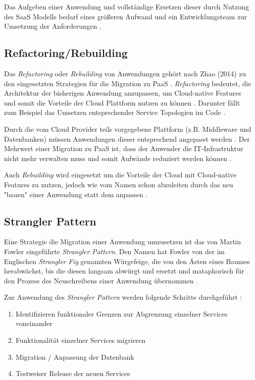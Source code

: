 Das Aufgeben einer Anwendung und vollständige Ersetzen dieser durch Nutzung des \ac{SaaS} Modells bedarf eines größeren Aufwand und ein Entwicklungsteam zur Umsetzung der Anforderungen \cite[Vgl.][]{CIO}. \pagebreak

\subsection{Refactoring/Rebuilding}
Das \textit{Refactoring} oder \textit{Rebuilding} von Anwendungen gehört nach Zhao (2014) zu den eingesetzten Strategien für die Migration zu \ac{PaaS} \cite[Vgl.][S. 144]{Zhao2014}. \textit{Refactoring} bedeutet, die Architektur der bisherigen Anwendung anzupassen, um Cloud-native Features \cite[Vgl.][S. 2]{Ahmad2018} und somit die Vorteile der Cloud Plattform nutzen zu können \cite[Vgl.][]{CIO}. Darunter fällt zum Beispiel das Umsetzen entsprechender Service Topologien im Code \cite[Vgl.][S. 2]{Holmes2018}.

Durch die vom Cloud Provider teils vorgegebene Plattform (z.B. Middleware und Datenbanken) müssen Anwendungen dieser entsprechend angepasst werden \cite[Vgl.][S. 227]{Surianarayanan2019}. Der Mehrwert einer Migration zu \ac{PaaS} ist, dass der Anwender die IT-Infrastruktur nicht mehr verwalten muss und somit Aufwände reduziert werden können \cite[Vgl.][S. 6]{Pahl}.

Auch \textit{Rebuilding} wird eingesetzt um die Vorteile der Cloud mit Cloud-native Features zu nutzen, jedoch wie vom Namen schon abzuleiten durch das neu "bauen" einer Anwendung statt dem anpassen \cite[Vgl.][S. 2]{Ahmad2018}.

\subsection{Strangler Pattern}
Eine Strategie die Migration einer Anwendung umzusetzen ist das von Martin Fowler eingeführte \textit{Strangler Pattern}. Den Namen hat Fowler von der im Englischen \textit{Strangler Fig} genannten Würgefeige, die von den Ästen eines Baumes herabwächst, bis die diesen langsam abwürgt und ersetzt und mataphorisch für den Prozess des Neuschreibens einer Anwendung übernommen \cite[Vgl.][]{Fowler2004}\cite[Vgl.][]{Ibryam2021}.

Zur Anwendung des \textit{Strangler Pattern} werden folgende Schritte durchgeführt \cite[Vgl. auch im Folgenden][]{Ibryam2021}:

\begin{enumerate}
    \item Identifizieren funktionaler Grenzen zur Abgrenzung einzelner Services voneinander
    \item Funktionalität einzelner Services migrieren
    \item Migration / Anpassung der Datenbank
    \item Testweiser Release der neuen Services
\end{enumerate}

